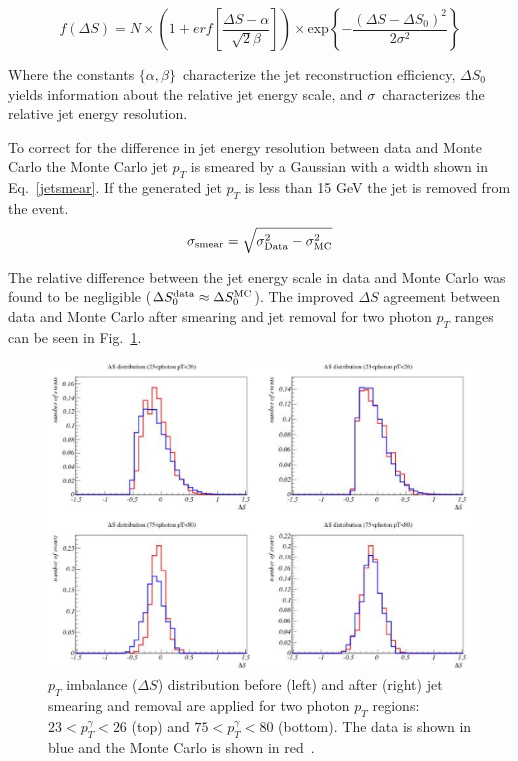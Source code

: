 \begin{equation}
\label{deltaSfit}
f(\Delta S) = N \times \left( 1 + erf  \left[ \frac{\Delta S - \alpha}{\sqrt{2} \beta} \right] \right) \times \mathrm{exp} \left\{ -\frac{(\Delta S - \Delta S_{0})^{2}}{2\sigma^{2}} \right\}
\end{equation}

\noindent Where the constants $\{ \alpha, \beta \}$~characterize the jet reconstruction efficiency, $\Delta S_{0}$ yields information about the relative jet energy scale, and $\sigma$~characterizes the relative jet energy resolution.

To correct for the difference in jet energy resolution between data and Monte Carlo the Monte Carlo jet $p_{T}$ is smeared by a Gaussian with a width shown in Eq.~\ref{jetsmear}. If the generated jet $p_{T}$ is less than 15 GeV the jet is removed from the event. 
\begin{equation}
\label{jetsmear}
\sigma_{\rm{smear}} = \sqrt{ \sigma_{\rm{Data}}^{2}  - \sigma_{\rm{MC}}^{2}}
\end{equation}

The relative difference between the jet energy scale in data and Monte Carlo was found to be negligible ($\Delta S^{\rm{data}}_{0} \approx \Delta S^{\rm{MC}}_{0}$). The improved $\Delta S$ agreement between data and Monte Carlo after smearing and jet removal for two photon $p_{T}$ ranges can be seen in Fig.~\ref{jssr}.

\begin{figure}[!h!tbp]
\begin{center}
\includegraphics[width=1.0\textwidth]{eps/Reco/SSR.eps}
\end{center}
\vspace{-0.1in}
\caption{$p_{T}$ imbalance ($\Delta S$) distribution before (left) and after (right) jet smearing and removal are applied for two photon $p_{T}$ regions: $23<p_{T}^{\gamma}<26$ (top) and $75<p_{T}^{\gamma}<80$ (bottom). The data is shown in blue and the Monte Carlo is shown in red~\cite{ssr}.}
\label{jssr}
\end{figure}


